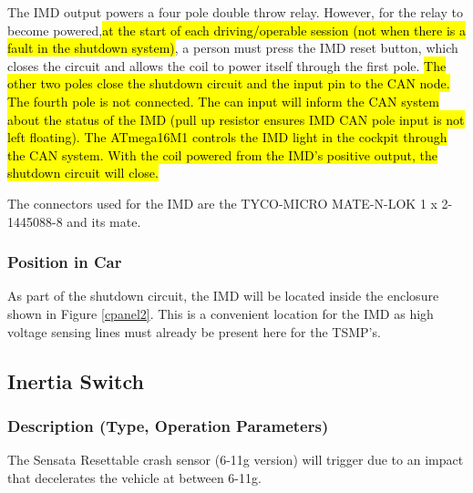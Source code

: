 \documentclass{article}
\DeclareRobustCommand{\hlr}[1]{{\sethlcolor{red}\hl{#1}}}
\begin{document}
            The IMD output powers a four pole double throw relay. However, for the relay to become powered,\hlr{at the start of each driving/operable session (not when there is a fault in the shutdown system)}, a person must press the IMD reset button, which closes the circuit and allows the coil to power itself through the first pole. \hlr{The other two poles close the shutdown circuit and the input pin to the CAN node. The fourth pole is not connected. The can input will inform the CAN system about the status of the IMD (pull up resistor ensures IMD CAN pole input is not left floating). The ATmega16M1 controls the IMD light in the cockpit through the CAN system. With the coil powered from the IMD's positive output, the shutdown circuit will close. }

            The connectors used for the IMD are the TYCO-MICRO MATE-N-LOK 1 x 2-1445088-8 and its mate.


        \subsubsection{Position in Car}

            As part of the shutdown circuit, the IMD will be located inside the enclosure shown in Figure \ref{cpanel2}. This is a convenient location for the IMD as high voltage sensing lines must already be present here for the TSMP's.

    \subsection{Inertia Switch}

        \subsubsection{Description (Type, Operation Parameters)}

            The Sensata Resettable crash sensor (6-11g version) will trigger due to an impact that decelerates the vehicle at between 6-11g.
\end{document}
